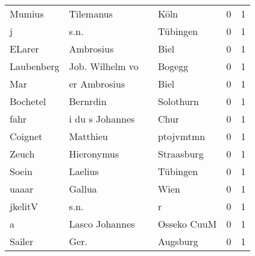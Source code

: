 \begin{center}
\begin{tiny}
\begin{longtabu}{llllrr}
                   Mumius &                          Tilemanus &             &                                        Köln &          0 &         1 \\
                        j &                               s.n. &             &                                    Tübingen &          0 &         1 \\
                   ELarer &                          Ambrosius &             &                                        Biel &          0 &         1 \\
               Laubenberg &                    Job. Wilhelm vo &             &                                      Bogegg &          0 &         1 \\
                      Mar &                       er Ambrosius &             &                                        Biel &          0 &         1 \\
                 Bochetel &                           Bernrdin &             &                                   Solothurn &          0 &         1 \\
                     fahr &                    i du s Johannes &             &                                        Chur &          0 &         1 \\
                  Coignet &                           Matthieu &             &                                   ptojvmtmn &          0 &         1 \\
                    Zeuch &                         Hieronymus &             &                                  Straasburg &          0 &         1 \\
                    Soein &                            Laelius &             &                                    Tübingen &          0 &         1 \\
                    uaaar &                             Gallua &             &                                        Wien &          0 &         1 \\
                  jkelitV &                               s.n. &             &                                           r &          0 &         1 \\
                        a &                     Lasco Johannes &             &                                 Osseko CuuM &          0 &         1 \\
                   Sailer &                               Ger. &             &                                    Augsburg &          0 &         1 \\

\end{longtabu}
\end{tiny}
\end{center}
